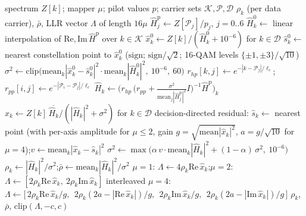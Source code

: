 \begin{algorithm}[H]
\caption{\textsc{SoftDemod}: spectrum to LLRs (\texttt{OFDMModem.demodulate\_symbol\_cp\_soft}), float.}
\label{alg:soft_demod}
\begin{algorithmic}[1]
\Require spectrum $Z[k]$; mapper $\mu$; pilot values $p$; carrier sets $\mathcal{K}, \mathcal{P}, \mathcal{D}$
\Ensure $\rho_k$ (per data carrier), $\bar\rho$, LLR vector $\Lambda$ of length $16\mu$
\State $\hat H^{\mathrm{p}}_j \gets Z[\mathcal{P}_j] / p_j$, $j = 0..6$ 
\State $\hat H^{0}_k \gets$ linear interpolation of $\mathrm{Re}, \mathrm{Im}\, \hat H^{\mathrm{p}}$ over $k \in \mathcal{K}$ 
\State $\hat x^{0}_k \gets Z[k] / (\hat H^{0}_k + 10^{-6})$ for $k \in \mathcal{D}$ 
\State $\hat s^{0}_k \gets$ nearest constellation point to $\hat x^{0}_k$ ($\mathrm{sign}$; $\mathrm{sign}/\sqrt2$; 16-QAM levels $\{\pm1,\pm3\}/\sqrt{10}$)
\State $\sigma^2 \gets \mathrm{clip}\big(\mathrm{mean}_k |\hat x^0_k - \hat s^0_k|^2 \cdot \mathrm{mean}_k |\hat H^0_k|^2,\ 10^{-6},\ 60\big)$ 
\State $r_{hp}[k,j] \gets e^{-|k - \mathcal{P}_j|/\ell_c}$;\quad $r_{pp}[i,j] \gets e^{-|\mathcal{P}_i - \mathcal{P}_j|/\ell_c}$ 
\State $\hat H_k \gets \Big(r_{hp}\,\big(r_{pp} + \tfrac{\sigma^2}{\mathrm{mean}_j|\hat H^{\mathrm{p}}_j|^2} I\big)^{-1} \hat H^{\mathrm{p}}\Big)_k$ 
\State $\hat x_k \gets Z[k]\, \overline{\hat H_k} \big/ (|\hat H_k|^2 + \sigma^2)$ for $k \in \mathcal{D}$ 
\State decision-directed residual: $\hat s_k \gets$ nearest point (with per-axis amplitude for $\mu \le 2$, gain $g = \sqrt{\mathrm{mean}|\hat x_k|^2}$, $a = g/\sqrt{10}$ for $\mu = 4$);\quad $v \gets \mathrm{mean}_k |\hat x_k - \hat s_k|^2$
\State $\sigma^2 \gets \max\big(\alpha\, v \cdot \mathrm{mean}_k|\hat H_k|^2 + (1 - \alpha)\, \sigma^2,\ 10^{-6}\big)$ 
\State $\rho_k \gets |\hat H_k|^2 / \sigma^2$;\quad $\bar\rho \gets \mathrm{mean}_k|\hat H_k|^2 / \sigma^2$
\State $\mu = 1$: $\Lambda \gets 4\rho_k \mathrm{Re}\,\hat x_k$;\quad $\mu = 2$: $\Lambda \gets [2\rho_k \mathrm{Re}\,\hat x_k,\ 2\rho_k \mathrm{Im}\,\hat x_k]$ interleaved
\State $\mu = 4$: $\Lambda \gets \big[\,2\rho_k \mathrm{Re}\,\hat x_k/g,\ \ 2\rho_k(2a - |\mathrm{Re}\,\hat x_k|)/g,\ \ 2\rho_k \mathrm{Im}\,\hat x_k/g,\ \ 2\rho_k(2a - |\mathrm{Im}\,\hat x_k|)/g\,\big]$ 
\State \Return $\rho_k$, $\bar\rho$, $\mathrm{clip}(\Lambda, -c, c)$
\end{algorithmic}
\end{algorithm}


